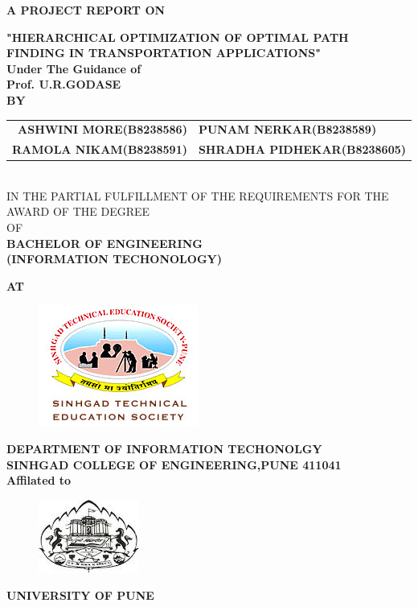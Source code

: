 \begin{center}
\renewcommand{\baselinestretch}{2}


\vspace{.4in}
{\large \bf A PROJECT REPORT ON}\\
 \vspace { 5mm}
 
{\large \bf "HIERARCHICAL OPTIMIZATION OF OPTIMAL PATH\\
 FINDING IN TRANSPORTATION APPLICATIONS"} \\
\textbf{Under The Guidance of}\\
\textbf{Prof. U.R.GODASE}\\
\vspace{.2in}
\textbf{BY}\\
\vspace{.2in}
\begin{tabular}{rl}
\textbf{ASHWINI MORE}\textbf{(B8238586)} & \textbf{PUNAM NERKAR}\textbf{(B8238589)}\\
\textbf{RAMOLA NIKAM}\textbf{(B8238591)}  & \textbf{SHRADHA PIDHEKAR}\textbf{(B8238605)  } \\
\end{tabular}\\
\vspace{.3in}
IN THE PARTIAL FULFILLMENT OF THE REQUIREMENTS 
FOR THE AWARD OF THE DEGREE\\[1mm]
OF\\[1mm]
\textbf{BACHELOR OF ENGINEERING\\ 
(INFORMATION TECHONOLOGY)}
\vspace{.1in}


{\large \bf AT}\\
\vspace{.3in}
\centering
		
\vspace{.1in}
\begin{figure}[htp]
\hspace*{5 cm}
\includegraphics[scale=1]{STES.png}
\end{figure}

{\bf DEPARTMENT OF INFORMATION TECHONOLGY}\\
\vspace{.1in}
{\bf SINHGAD COLLEGE OF ENGINEERING,PUNE 411041}\\
\hspace*{3 cm}\textbf{Affilated to}
\vspace{.1in}
\begin{figure}[htp]
\hspace*{6 cm}
\includegraphics[scale=1]{inpune.jpg}
\end{figure}
\newline
\textbf{UNIVERSITY OF PUNE}
\end{center}
